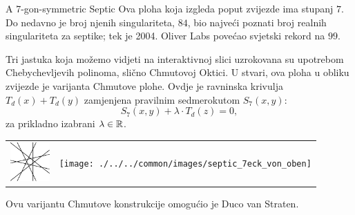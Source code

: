 \begin{surferPage}[7-gon]{A 7-gon-symmetric Septic}
		Ova ploha koja izgleda poput zvijezde ima stupanj $7$.
		Do nedavno je broj njenih singulariteta, $84$, bio 
		najve\'{c}i poznati broj realnih singulariteta za septike;
		tek je 2004. Oliver Labs pove\'{c}ao svjetski rekord na $99$.
  
  
Tri jastuka koja mo\v{z}emo vidjeti na interaktivnoj slici
		uzrokovana su upotrebom Chebychevljevih polinoma, sli\v{c}no Chmutovoj Oktici.
		U stvari, ova ploha u obliku zvijezde je varijanta Chmutove plohe.
		Ovdje je ravninska krivulja $T_d(x)+T_d(y)$ zamjenjena pravilnim sedmerokutom
    $S_7(x,y)$: 
   \[S_7(x,y) + \lambda \cdot T_d(z) = 0,\]
		za prikladno izabrani $\lambda\in{\mathbb R}$. 
    \vspace*{-0.3em}
    \begin{center}
      \begin{tabular}{c@{\qquad}c}
        \includegraphics[height=1.5cm]{./../../common/images/labsseptic1.pdf}
        &
        \texttt{[image: ./../../common/images/septic\_7eck\_von\_oben]}
      \end{tabular}
    \end{center}
    \vspace*{-0.3em}   
	Ovu varijantu Chmutove konstrukcije omogu\'{c}io je Duco van Straten.
\end{surferPage}
